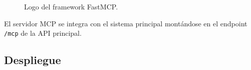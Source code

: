 \begin{figure}[H]
  \centering
  \caption{Logo del framework FastMCP.}
  \label{fig:fastmcp}
\end{figure}



El servidor MCP se integra con el sistema principal montándose en el endpoint \texttt{/mcp} de la API principal.










\subsection{Despliegue}


